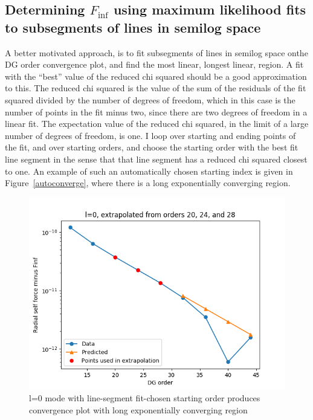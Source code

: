 \subsection{Determining $F_{\inf}$ using maximum likelihood fits to subsegments of lines in semilog space}
A better motivated approach, is to fit subsegments of lines in semilog space onthe DG order convergence plot, and find the most linear, longest linear, region. A fit with the ``best'' value of the reduced chi squared should be a good approximation to this. The reduced chi squared is the value of the sum of the residuals of the fit squared divided by the number of degrees of freedom, which in this case is the number of points in the fit minus two, since there are two degrees of freedom in a linear fit. The expectation value of the reduced chi squared, in the limit of a large number of degrees of freedom, is one. I loop over starting and ending points of the fit, and over starting orders, and choose the starting order with the best fit line segment in the sense that that line segment has a reduced chi squared closest to one. An example of such an automatically chosen starting index is given in Figure~\ref{autoconverge}, where there is a long exponentially converging region.

\begin{figure}
  \includegraphics{fittingtechniqet370l0}
  \caption{l=0 mode with line-segment fit-chosen starting order produces convergence plot with long exponentially converging region}
\end{figure}






